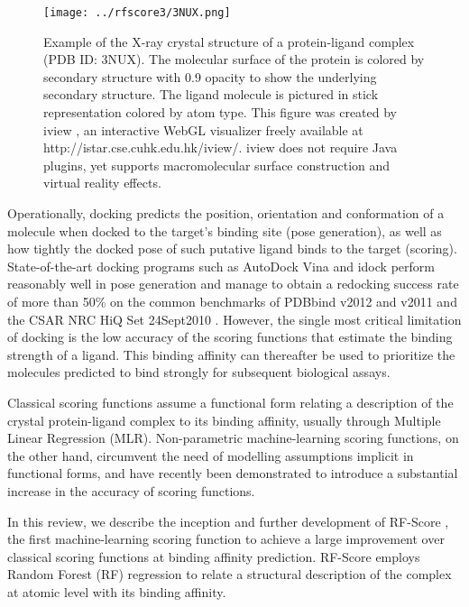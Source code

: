 \documentclass{llncs}
\begin{document}
\begin{figure}
\texttt{[image: ../rfscore3/3NUX.png]}
\caption{Example of the X-ray crystal structure of a protein-ligand complex (PDB ID: 3NUX). The molecular surface of the protein is colored by secondary structure with 0.9 opacity to show the underlying secondary structure. The ligand molecule is pictured in stick representation colored by atom type. This figure was created by iview \cite{1366}, an interactive WebGL visualizer freely available at http://istar.cse.cuhk.edu.hk/iview/. iview does not require Java plugins, yet supports macromolecular surface construction and virtual reality effects.}
\label{3NUX}
\end{figure}

Operationally, docking predicts the position, orientation and conformation of a molecule when docked to the target's binding site (pose generation), as well as how tightly the docked pose of such putative ligand binds to the target (scoring). State-of-the-art docking programs such as AutoDock Vina \cite{595} and idock \cite{1153} perform reasonably well in pose generation and manage to obtain a redocking success rate of more than 50\% \cite{1362} on the common benchmarks of PDBbind v2012 and v2011 \cite{529,530} and the CSAR NRC HiQ Set 24Sept2010 \cite{857,960}. However, the single most critical limitation of docking is the low accuracy of the scoring functions that estimate the binding strength of a ligand. This binding affinity can thereafter be used to prioritize the molecules predicted to bind strongly for subsequent biological assays.

Classical scoring functions \cite{1313} assume a functional form relating a description of the crystal protein-ligand complex to its binding affinity, usually through Multiple Linear Regression (MLR). Non-parametric machine-learning scoring functions, on the other hand, circumvent the need of modelling assumptions implicit in functional forms, and have recently been demonstrated \cite{564,908} to introduce a substantial increase in the accuracy of scoring functions. 

In this review, we describe the inception and further development of RF-Score \cite{564}, the first machine-learning scoring function to achieve a large improvement over classical scoring functions \cite{1313} at binding affinity prediction. RF-Score employs Random Forest (RF) regression \cite{1309} to relate a structural description of the complex at atomic level with its binding affinity.
\end{document}
